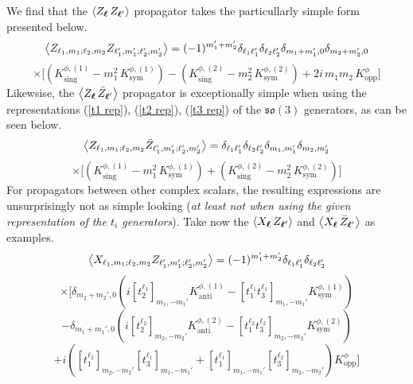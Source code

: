 \newpage
We find that the $\expval{Z_{\boldsymbol{\ell}} \, Z_{\boldsymbol{\ell}'}}$ propagator takes the particullarly simple form presented below.
%
%
\begin{equation*}
\expval{
Z_{\ell_1,m_1;\ell_2,m_2}
Z_{\ell_1',m_1';\ell_2',m_2'}
}
=
(-1)^{m_1' + m_2'}
\delta_{\ell_1 \ell_1'} \delta_{\ell_2 \ell_2'}
\delta_{m_1+m_1',0} \delta_{m_2 + m_2',0} 
\end{equation*}
%
%
\begin{equation}
\times
\Bigg[
\left(
K^{\phi,(1)}_{\mathrm{sing}} - m_1^2 \, K^{\phi,(1)}_{\mathrm{sym}}
\right)
-
\left(
K^{\phi,(2)}_{\mathrm{sing}} - m_2^2 \, K^{\phi,(2)}_{\mathrm{sym}}
\right)
+
2i \,
m_1 m_2 \, K^{\phi}_{\mathrm{opp}}
\Bigg]
\end{equation}
%
%
Likewsise, the $\expval{Z_{\boldsymbol{\ell}} \, \bar{Z}_{\boldsymbol{\ell}'}}$ propagator is exceptionally simple when using the representations (\ref{t1 rep}), (\ref{t2 rep}), (\ref{t3 rep}) of the $\mathfrak{so}(3)$ generators, as can be seen below.
%
%
\begin{equation*}
\expval{
Z_{\ell_1,m_1;\ell_2,m_2}
\bar{Z}_{\ell_1',m_1';\ell_2',m_2'}
}
=
\delta_{\ell_1 \ell_1'} \delta_{\ell_2 \ell_2'}
\delta_{m_1,m_1'} \delta_{m_2,m_2'}
\end{equation*}
%
%
\begin{equation}
\times
\Bigg[
\left(
K^{\phi,(1)}_{\mathrm{sing}} - m_1^2 \, K^{\phi,(1)}_{\mathrm{sym}}
\right)
+
\left(
K^{\phi,(2)}_{\mathrm{sing}} - m_2^2 \, K^{\phi,(2)}_{\mathrm{sym}}
\right)
\Bigg]
\end{equation}
%
%
For propagators between other complex scalars, the resulting expressions are unsurprisingly not as simple looking (\textit{at least not when using the given representation of the $t_i$ generators}). Take now the $\expval{X_{\boldsymbol{\ell}} \, Z_{\boldsymbol{\ell}'}}$ and $\expval{X_{\boldsymbol{\ell}} \, \bar{Z}_{\boldsymbol{\ell}'}}$ as examples.
%
%
\begin{equation*}
\expval{
X_{\ell_1,m_1;\ell_2,m_2}
Z_{\ell_1',m_1';\ell_2',m_2'}
}
=
(-1)^{m_1' + m_2'} \delta_{\ell_1 \ell_1'} \delta_{\ell_2 \ell_2'}
\end{equation*}
%
%
\begin{equation*}
\times
\Bigg[
\delta_{m_2 + m_2',0}
\left(
i [t_2^{\ell_1}]_{m_1,-m_1'} K^{\phi,(1)}_{\text{anti}}
- [t_1^{\ell_1} t_3^{\ell_1}]_{m_1,-m_1'} K^{\phi,(1)}_{\text{sym}}
\right)
\end{equation*}
%
%
\begin{equation*}
-
\delta_{m_1 + m_1',0}
\left(
i [t_2^{\ell_2}]_{m_2,-m_2'} K^{\phi,(2)}_{\text{anti}}
- [t_1^{\ell_2} t_3^{\ell_2}]_{m_2,-m_2'} K^{\phi,(2)}_{\text{sym}}
\right)
\end{equation*}
%
%
\begin{equation}
+ i \left(
[t_1^{\ell_2}]_{m_2,-m_2'} [t_3^{\ell_1}]_{m_1,-m_1'}
+
[t_1^{\ell_1}]_{m_1,-m_1'} [t_3^{\ell_2}]_{m_2,-m_2'}
\right)
K^{\phi}_{\text{opp}}
\Bigg]
\end{equation}
%
%

